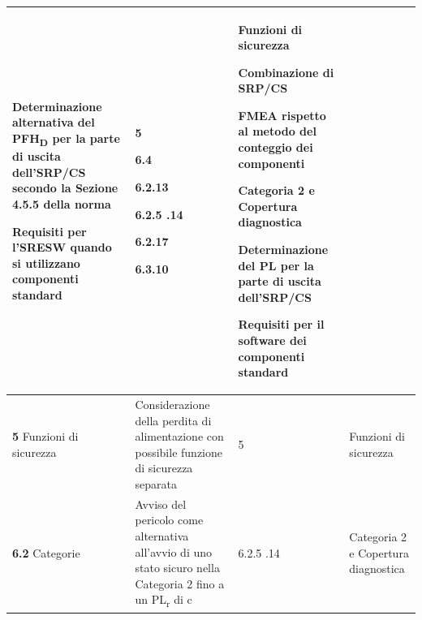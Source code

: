 \begin{tabularx}{\textwidth}{|p{2.6cm}|p{7.8cm}|p{1.3cm}X|}
    \par\vspace{3pt}
    Determinazione alternativa del PFH\textsubscript{D} per la parte di uscita dell'SRP/CS secondo la Sezione 4.5.5 della norma
    \par\vspace{3pt}
    Requisiti per l'SRESW quando si utilizzano componenti standard &
    5
    \par\vspace{3pt}
    6.4
    \par\vspace{3pt}
    6.2.13
    \par\vspace{3pt}
    6.2.5 \newline 6.2.14
    \par\vspace{3pt}
    6.2.17
    \par\vspace{3pt}
    6.3.10 &
    Funzioni di sicurezza
    \par\vspace{3pt}
    Combinazione di SRP/CS
    \par\vspace{3pt}
    FMEA rispetto al metodo del conteggio dei componenti
    \par\vspace{3pt}
    Categoria 2 e \newline Copertura diagnostica
    \par\vspace{3pt}
    Determinazione del PL per la parte di uscita dell'SRP/CS
    \par\vspace{3pt}
    Requisiti per il software dei componenti standard \\
    \hline
    \textbf{5} \newline Funzioni di sicurezza &
    Considerazione della perdita di alimentazione con possibile funzione di sicurezza separata &
    5 & Funzioni di sicurezza \\
    \hline
    \rowcolor{black!8}
    \textbf{6.2} \newline Categorie &
    Avviso del pericolo come alternativa all'avvio di uno stato sicuro nella Categoria 2 fino a un PL\textsubscript{\small r} di c &
    6.2.5 \newline 6.2.14 & Categoria 2 e \newline Copertura diagnostica \\
    \hline

\end{tabularx}
